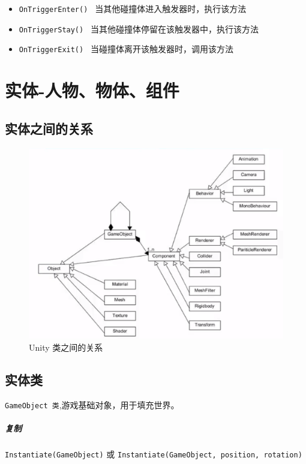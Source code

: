 \documentclass[UTF8,a4paper,12pt]{ctexbook}
\begin{document}
		\begin{itemize}
			\item \verb|OnTriggerEnter() | 当其他碰撞体进入触发器时，执行该方法
			\item \verb|OnTriggerStay() | 当其他碰撞体停留在该触发器中，执行该方法
			\item \verb|OnTriggerExit() | 当碰撞体离开该触发器时，调用该方法
		\end{itemize}
		

\chapter{实体-人物、物体、组件}
	
	\section{实体之间的关系}
		\begin{figure}[H]
			\centering
			\includegraphics[scale=0.5]{class}
			\caption{Unity 类之间的关系}
		\end{figure}	
		
	\section{实体类} \verb|GameObject 类|,游戏基础对象，用于填充世界。
		\paragraph{复制}
			\verb|Instantiate(GameObject)| 或 \verb|Instantiate(GameObject, position, rotation)|
			
\end{document}

